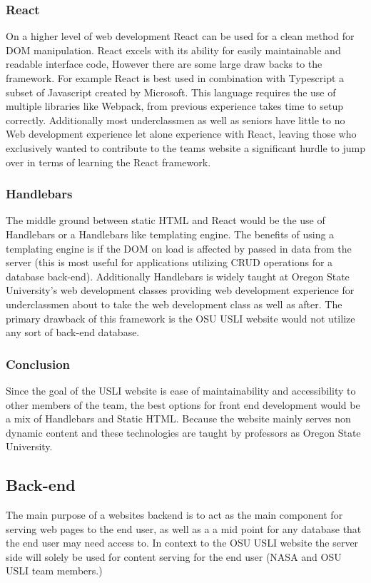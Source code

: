 \documentclass[onecolumn, draftclsnofoot,10pt, compsoc]{IEEEtran}
\begin{document}
\subsubsection{React}
On a higher level of web development React can be used for a clean method for DOM manipulation. React excels with its ability for easily maintainable and readable interface code, However there are some large draw backs to the framework. For example React is best used in combination with Typescript a subset of Javascript created by Microsoft. This language requires the use of multiple libraries like Webpack, from previous experience takes time to setup correctly. Additionally most underclassmen as well as seniors have little to no Web development experience let alone experience with React, leaving those who exclusively wanted to contribute to the teams website a significant hurdle to jump over in terms of learning the React framework.
\subsubsection{Handlebars}
The middle ground between static HTML and React would be the use of Handlebars or a Handlebars like templating engine. The benefits of using a templating engine is if the DOM on load is affected by passed in data from the server\cite{Handlebars75:online} (this is most useful for applications utilizing CRUD operations for a database back-end). Additionally Handlebars is widely taught at Oregon State University's web development classes providing web development experience for underclassmen about to take the web development class as well as after. The primary drawback of this framework is the OSU USLI website would not utilize any sort of back-end database.
\subsubsection{Conclusion}
Since the goal of the USLI website is ease of maintainability and accessibility to other members of the team, the best options for front end development would be a mix of Handlebars and Static HTML. Because the website mainly serves non dynamic content and these technologies are taught by professors as Oregon State University.

\subsection{Back-end}
The main purpose of a websites backend is to act as the main component for serving web pages to the end user, as well as a a mid point for any database that the end user may need access to. In context to the OSU USLI website the server side will solely be used for content serving for the end user (NASA and OSU USLI team members.)
\end{document}
